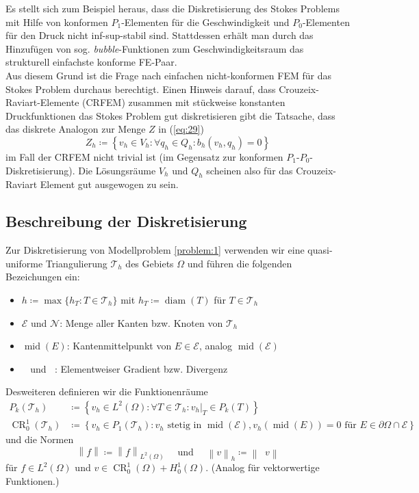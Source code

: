 \documentclass[a4paper]{scrartcl}
\newcommand{\Hzero}{H_0^1}
\newcommand{\Ltwo}{L^2}
\newcommand{\crfem}{\operatorname{CR}_0^1}
\newcommand{\mesh}{\mathcal{T}_h}
\newcommand{\edges}{\mathcal{E}}
\newcommand{\nodes}{\mathcal{N}}
\newcommand{\norm}[1]{\left\lVert#1\right\rVert}
\newcommand{\hnorm}[1]{\left\lVert#1\right\rVert_h}
\newcommand{\set}[1]{\left\{#1\right\}}
\newcommand{\black}{\color{black}}
\DeclareMathOperator{\divh}{div_h}
\DeclareMathOperator{\nablah}{\nabla_{\textit{h}}}
\DeclareMathOperator{\diam}{diam}
\DeclareMathOperator{\midOp}{mid}
\theoremstyle{plain}
\theoremstyle{definition}
\theoremstyle{remark}
\begin{document}
\noindent Es stellt sich zum Beispiel heraus, dass die Diskretisierung des
Stokes Problems mit Hilfe von konformen \(P_1\)-Elementen für die
Geschwindigkeit und \(P_0\)-Elementen für den Druck nicht
inf-sup-stabil sind. Stattdessen erhält man durch das Hinzufügen von
sog. \emph{bubble}-Funktionen zum Geschwindigkeitsraum das strukturell
einfachste konforme FE-Paar. \\ 

\black
\noindent Aus diesem Grund ist die Frage nach einfachen
nicht-konformen FEM für das Stokes Problem durchaus berechtigt. Einen
Hinweis darauf, dass Crouzeix-Raviart-Elemente (CRFEM) zusammen mit
stückweise konstanten Druckfunktionen das Stokes Problem gut
diskretisieren gibt die Tatsache, dass das diskrete Analogon zur Menge
\(Z\) in (\ref{eq:29}) 
\begin{equation}
  \label{eq:31}
  Z_h \coloneqq \set{v_h \in V_h\colon \forall q_h \in Q_h\colon b_h(v_h, q_h) = 0} 
\end{equation}
im Fall der CRFEM nicht trivial ist (im Gegensatz zur konformen
\(P_1\)-\(P_0\)-Diskretisierung). Die Lösungsräume \(V_h\) und \(Q_h\)
scheinen also für das Crouzeix-Raviart Element gut ausgewogen zu sein. 


\subsection{Beschreibung der Diskretisierung}
\label{sec:beschr-der-diskr}

Zur Diskretisierung von Modellproblem \ref{problem:1} verwenden wir
eine quasi-uniforme Triangulierung \(\mesh\) des Gebiets \(\Omega\)
und führen die folgenden Bezeichungen ein: 

\begin{itemize}
\item \(h \coloneqq \max\{h_T\colon T \in \mesh\}\) mit \(h_T \coloneqq \diam(T)\) für \(T\in \mesh\)
\item \(\edges\) und \(\nodes\):  Menge aller Kanten
  bzw. Knoten von \(\mesh\)
\item \(\midOp(E)\): Kantenmittelpunkt von \(E \in \edges\), analog \(\midOp(\edges)\)
\item \(\nablah\) und \(\divh\): Elementweiser Gradient bzw. Divergenz
\end{itemize}

\noindent Desweiteren definieren wir die Funktionenräume
\begin{align}
  \label{al:2}
P_k(\mesh) &\coloneqq \set{v_h \in \Ltwo(\Omega)\colon \forall T \in
  \mesh\colon v_h|_T \in P_k(T)} \\
  \crfem(\mesh) &\coloneqq \set{v_h \in P_1(\mesh)\colon v_h \text{ stetig in } \midOp(\edges), v_h(\midOp(E)) = 0 \text{ für } E \in \partial\Omega\cap\edges}
\end{align}
und die Normen
  \begin{equation}
    \label{eq:10}
    \norm{f} \coloneqq \norm{f}_{\Ltwo(\Omega)} \quad \text{ und } \quad
    \hnorm{v} \coloneqq \norm{\nablah v}  
  \end{equation}
für \(f\in \Ltwo(\Omega)\) und \(v \in \crfem(\Omega) +
\Hzero(\Omega)\). (Analog für vektorwertige Funktionen.)
\end{document}
